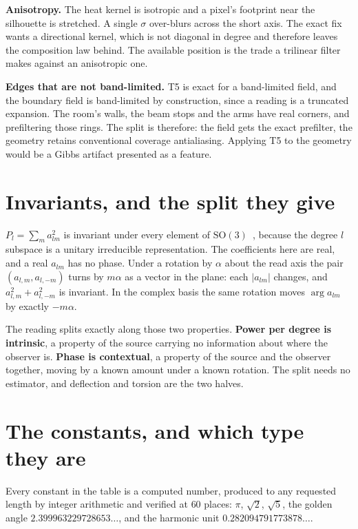 \textbf{Anisotropy.} The heat kernel is isotropic and a pixel's footprint near the silhouette is stretched. A single \(\sigma\) over-blurs across the short axis. The exact fix wants a directional kernel, which is not diagonal in degree and therefore leaves the composition law behind. The available position is the trade a trilinear filter makes against an anisotropic one.

\textbf{Edges that are not band-limited.} T5 is exact for a band-limited field, and the boundary field is band-limited by construction, since a reading is a truncated expansion. The room's walls, the beam stops and the arms have real corners, and prefiltering those rings. The split is therefore: the field gets the exact prefilter, the geometry retains conventional coverage antialiasing. Applying T5 to the geometry would be a Gibbs artifact presented as a feature.

\section{Invariants, and the split they give}

\(P_l = \sum_m a_{lm}^2\) is invariant under every element of \(\mathrm{SO}(3)\)~\cite{src:Kazhdan-Funkhouser-and-Rusinkiewicz-2003}, because the degree \(l\) subspace is a unitary irreducible representation. The coefficients here are real, and a real \(a_{lm}\) has no phase. Under a rotation by \(\alpha\) about the read axis the pair \((a_{l,m}, a_{l,-m})\) turns by \(m\alpha\) as a vector in the plane: each \(|a_{lm}|\) changes, and \(a_{l,m}^2 + a_{l,-m}^2\) is invariant. In the complex basis the same rotation moves \(\arg a_{lm}\) by exactly \(-m\alpha\).

The reading splits exactly along those two properties. \textbf{Power per degree is intrinsic}, a property of the source carrying no information about where the observer is. \textbf{Phase is contextual}, a property of the source and the observer together, moving by a known amount under a known rotation. The split needs no estimator, and deflection and torsion are the two halves.

\section{The constants, and which type they are}

Every constant in the table is a computed number, produced to any requested length by integer arithmetic and verified at \(60\) places: \(\pi\), \(\sqrt{2}\), \(\sqrt{5}\), the golden angle \(2.399963229728653\ldots\), and the harmonic unit \(0.282094791773878\ldots\).

